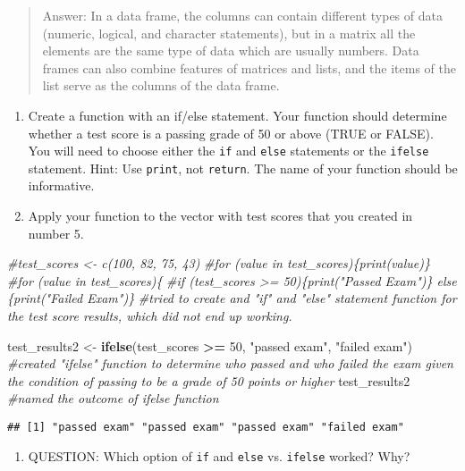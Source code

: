 \documentclass[]{article}
\newenvironment{Shaded}{\begin{snugshade}}{\end{snugshade}}
\newcommand{\CommentTok}[1]{\textcolor[rgb]{0.56,0.35,0.01}{\textit{#1}}}
\newcommand{\DecValTok}[1]{\textcolor[rgb]{0.00,0.00,0.81}{#1}}
\newcommand{\KeywordTok}[1]{\textcolor[rgb]{0.13,0.29,0.53}{\textbf{#1}}}
\newcommand{\NormalTok}[1]{#1}
\newcommand{\OperatorTok}[1]{\textcolor[rgb]{0.81,0.36,0.00}{\textbf{#1}}}
\newcommand{\StringTok}[1]{\textcolor[rgb]{0.31,0.60,0.02}{#1}}
\providecommand{\tightlist}{%
  \setlength{\itemsep}{0pt}\setlength{\parskip}{0pt}}
\begin{document}
\begin{quote}
Answer: In a data frame, the columns can contain different types of data
(numeric, logical, and character statements), but in a matrix all the
elements are the same type of data which are usually numbers. Data
frames can also combine features of matrices and lists, and the items of
the list serve as the columns of the data frame.
\end{quote}

\begin{enumerate}
\def\labelenumi{\arabic{enumi}.}
\setcounter{enumi}{9}
\item
  Create a function with an if/else statement. Your function should
  determine whether a test score is a passing grade of 50 or above (TRUE
  or FALSE). You will need to choose either the \texttt{if} and
  \texttt{else} statements or the \texttt{ifelse} statement. Hint: Use
  \texttt{print}, not \texttt{return}. The name of your function should
  be informative.
\item
  Apply your function to the vector with test scores that you created in
  number 5.
\end{enumerate}

\begin{Shaded}
\begin{Highlighting}[]
\CommentTok{#test_scores <- c(100, 82, 75, 43) }
\CommentTok{#for (value in test_scores)\{print(value)\}}
\CommentTok{#for (value in test_scores)\{}
  \CommentTok{#if (test_scores >= 50)\{print("Passed Exam")\} else \{print("Failed Exam")\} }
\CommentTok{#tried to create and "if" and "else" statement function for the test score results, which did not end up working.}

\NormalTok{test_results2 <-}\StringTok{ }\KeywordTok{ifelse}\NormalTok{(test_scores }\OperatorTok{>=}\StringTok{ }\DecValTok{50}\NormalTok{, }\StringTok{"passed exam"}\NormalTok{, }\StringTok{"failed exam"}\NormalTok{) }\CommentTok{#created "ifelse" function to determine who passed and who failed the exam given the condition of passing to be a grade of 50 points or higher}
\NormalTok{test_results2 }\CommentTok{#named the outcome of ifelse function}
\end{Highlighting}
\end{Shaded}

\begin{verbatim}
## [1] "passed exam" "passed exam" "passed exam" "failed exam"
\end{verbatim}

\begin{enumerate}
\def\labelenumi{\arabic{enumi}.}
\setcounter{enumi}{11}
\tightlist
\item
  QUESTION: Which option of \texttt{if} and \texttt{else} vs.
  \texttt{ifelse} worked? Why?
\end{enumerate}
\end{document}
